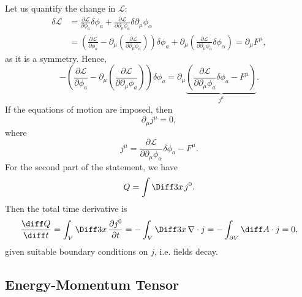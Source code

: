 \documentclass[12pt]{article}
\begin{document}
\begin{proofbox}
	Let us quantify the change in $\mathcal{L}$:
	\begin{align*}
		\delta \mathcal{L} &= \frac{\partial \mathcal{L}}{\partial \phi_a}  \delta \phi_a + \frac{\partial \mathcal{L}}{\partial \partial_\mu \phi_a} \delta \partial_\mu \phi_\alpha \\
				   &= \left( \frac{\partial \mathcal{L}}{\partial \phi_a} - \partial_\mu \left( \frac{\partial \mathcal{L}}{\partial \partial_\mu \phi_a} \right) \right) \delta \phi_a + \partial_\mu \left( \frac{\partial \mathcal{L}}{\partial \partial_\mu \phi_a} \delta \phi_\alpha \right) = \partial_\mu F^\mu,
	\end{align*}
	as it is a symmetry. Hence,
	\[
		- \left( \frac{\partial \mathcal{L}}{\partial \phi_a} - \partial_\mu \left( \frac{\partial \mathcal{L}}{\partial \partial_\mu \phi_a} \right) \right) \delta \phi_a = \partial_\mu \underbrace{\left( \frac{\partial \mathcal{L}}{\partial \partial_\mu \phi_a} \delta \phi_a - F^\mu \right)}_{j^\mu}.
	\]
	If the equations of motion are imposed, then
	\[
	\partial_\mu j^\mu = 0,
	\]
	where
	\[
	j^\mu = \frac{\partial \mathcal{L}}{\partial \partial_\mu \phi_\alpha} \delta \phi_a - F^\mu.
	\]
	For the second part of the statement, we have
	\[
	Q = \int \Diff 3 x \, j^0.
	\]
	Then the total time derivative is
	\[
	\frac{\diff Q}{\diff t} = \int_V \Diff3 x\, \frac{\partial j^0}{\partial t} = - \int_V \Diff3 x \, \nabla \cdot j = - \int_{\partial V} \diff A \cdot j = 0,
	\]
	given suitable boundary conditions on $j$, i.e. fields decay.
\end{proofbox}

\subsection{Energy-Momentum Tensor}%
\label{sub:em_t}
\end{document}
